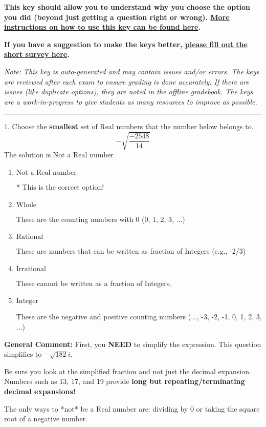 \documentclass{extbook}[14pt]
\begin{document}
\textbf{This key should allow you to understand why you choose the option you did (beyond just getting a question right or wrong). \href{https://xronos.clas.ufl.edu/mac1105spring2020/courseDescriptionAndMisc/Exams/LearningFromResults}{More instructions on how to use this key can be found here}.}

\textbf{If you have a suggestion to make the keys better, \href{https://forms.gle/CZkbZmPbC9XALEE88}{please fill out the short survey here}.}

\textit{Note: This key is auto-generated and may contain issues and/or errors. The keys are reviewed after each exam to ensure grading is done accurately. If there are issues (like duplicate options), they are noted in the offline gradebook. The keys are a work-in-progress to give students as many resources to improve as possible.}

\rule{\textwidth}{0.4pt}

1. Choose the \textbf{smallest} set of Real numbers that the number below belongs to.
\[ -\sqrt{\frac{-2548}{14}} \] 
The solution is $ \text{Not a Real number} $ 

\begin{enumerate}[label=\Alph*.] 
\item $ \text{Not a Real number} $ 

 * This is the correct option! 
\item $ \text{Whole} $ 

 These are the counting numbers with 0 (0, 1, 2, 3, ...) 
\item $ \text{Rational} $ 

 These are numbers that can be written as fraction of Integers (e.g., -2/3) 
\item $ \text{Irrational} $ 

 These cannot be written as a fraction of Integers. 
\item $ \text{Integer} $ 

 These are the negative and positive counting numbers (..., -3, -2, -1, 0, 1, 2, 3, ...) 
\end{enumerate} 
 
\textbf{General Comment:} First, you \textbf{NEED} to simplify the expression. This question simplifies to $-\sqrt{182} i$. 
 
 Be sure you look at the simplified fraction and not just the decimal expansion. Numbers such as 13, 17, and 19 provide \textbf{long but repeating/terminating decimal expansions!} 
 
 The only ways to *not* be a Real number are: dividing by 0 or taking the square root of a negative number. 
 
\end{document}
